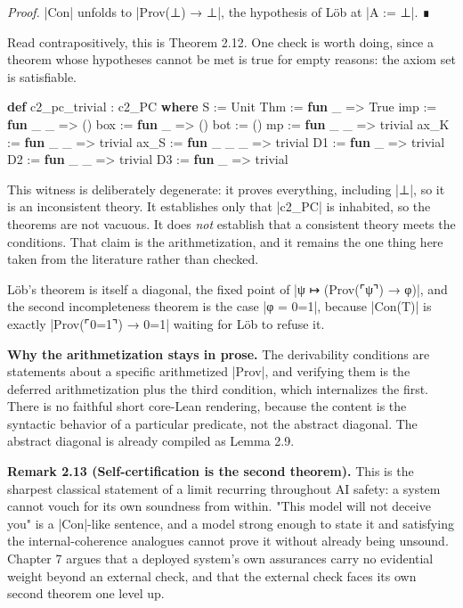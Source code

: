 \documentclass{memoir}
\begin{document}
\emph{Proof.} \LeanVerb|Con| unfolds to \LeanVerb|Prov(⊥) → ⊥|, the hypothesis of Löb at \LeanVerb|A := ⊥|. ∎

Read contrapositively, this is Theorem 2.12. One check is worth doing, since a
theorem whose hypotheses cannot be met is true for empty reasons: the axiom set
is satisfiable.

\begin{LeanVerbatim}
\textbf{def} c2_pc_trivial : c2_PC \textbf{where}
  S := Unit
  Thm := \textbf{fun} _ => True
  imp := \textbf{fun} _ _ => ()
  box := \textbf{fun} _ => ()
  bot := ()
  mp := \textbf{fun} _ _ => trivial
  ax_K := \textbf{fun} _ _ => trivial
  ax_S := \textbf{fun} _ _ _ => trivial
  D1 := \textbf{fun} _ => trivial
  D2 := \textbf{fun} _ _ => trivial
  D3 := \textbf{fun} _ => trivial

\end{LeanVerbatim}


This witness is deliberately degenerate: it proves everything, including \LeanVerb|⊥|, so
it is an inconsistent theory. It establishes only that \LeanVerb|c2_PC| is
inhabited, so the theorems are not vacuous. It does \emph{not} establish that a
consistent theory meets the conditions. That claim is the arithmetization, and
it remains the one thing here taken from the literature rather than checked.

Löb's theorem is itself a diagonal, the fixed point of \LeanVerb|ψ ↦ (Prov(⌜ψ⌝) → φ)|,
and the second incompleteness theorem is the case \LeanVerb|φ = 0=1|, because \LeanVerb|Con(T)| is
exactly \LeanVerb|Prov(⌜0=1⌝) → 0=1| waiting for Löb to refuse it.

\textbf{Why the arithmetization stays in prose.} The derivability conditions are
statements about a specific arithmetized \LeanVerb|Prov|, and verifying them is the
deferred arithmetization plus the third condition, which internalizes the first.
There is no faithful short core-Lean rendering, because the content is the
syntactic behavior of a particular predicate, not the abstract diagonal. The
abstract diagonal is already compiled as Lemma 2.9.

\textbf{Remark 2.13 (Self-certification is the second theorem).} This is the sharpest
classical statement of a limit recurring throughout AI safety: a system cannot
vouch for its own soundness from within. "This model will not deceive you" is a
\LeanVerb|Con|-like sentence, and a model strong enough to state it and satisfying the
internal-coherence analogues cannot prove it without already being unsound.
Chapter 7 argues that a deployed system's own assurances carry no evidential
weight beyond an external check, and that the external check faces its own
second theorem one level up.
\end{document}
